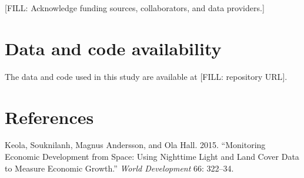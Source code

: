 \documentclass[
  letterpaper,
  DIV=11,
  numbers=noendperiod]{scrartcl}
\newlength{\cslhangindent}
\newenvironment{CSLReferences}[2] %
 {\begin{list}{}{%
  \setlength{\itemindent}{0pt}
  \setlength{\leftmargin}{0pt}
  \setlength{\parsep}{0pt}
  \ifodd #1
   \setlength{\leftmargin}{\cslhangindent}
   \setlength{\itemindent}{-1\cslhangindent}
  \fi
  \setlength{\itemsep}{#2\baselineskip}}}
 {\end{list}}
\begin{document}
{[}FILL: Acknowledge funding sources, collaborators, and data
providers.{]}

\section{Data and code availability}\label{data-and-code-availability}

The data and code used in this study are available at {[}FILL:
repository URL{]}.

\section*{References}\label{references}

\protect{}\label{refs}
\begin{CSLReferences}{1}{1}
Keola, Souknilanh, Magnus Andersson, and Ola Hall. 2015. {``Monitoring
Economic Development from Space: Using Nighttime Light and Land Cover
Data to Measure Economic Growth.''} \emph{World Development} 66:
322--34.

\end{CSLReferences}
\end{document}
